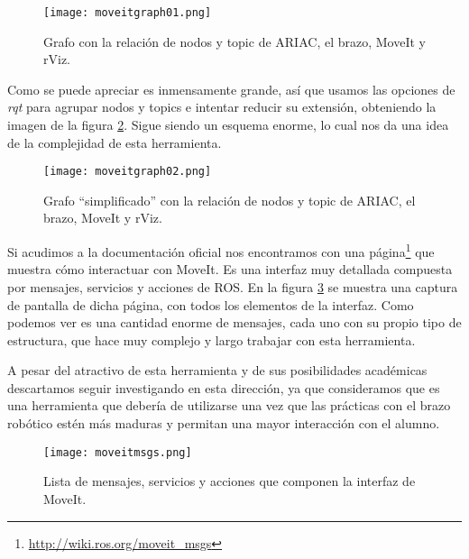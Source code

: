 \begin{figure}[h]
	\centering
	\texttt{[image: moveitgraph01.png]}
	\caption{Grafo con la relación de nodos y topic de ARIAC, el brazo, MoveIt y rViz.} \label{fig:moveitgraph1}
\end{figure}

Como se puede apreciar es inmensamente grande, así que usamos las opciones de \textit{rqt} para agrupar nodos y topics e intentar reducir su extensión, obteniendo la imagen de la figura \ref{fig:moveitgraph2}. Sigue siendo un esquema enorme, lo cual nos da una idea de la complejidad de esta herramienta.

\begin{figure}[h]
	\centering
	\texttt{[image: moveitgraph02.png]}
	\caption{Grafo “simplificado” con la relación de nodos y topic de ARIAC, el brazo, MoveIt y rViz.} \label{fig:moveitgraph2}
\end{figure}

Si acudimos a la documentación oficial nos encontramos con una página\footnote{\url{http://wiki.ros.org/moveit_msgs}} que muestra cómo interactuar con MoveIt. Es una interfaz muy detallada compuesta por mensajes, servicios y acciones de ROS. En la figura \ref{fig:moveitmsgs} se muestra una captura de pantalla de dicha página, con todos los elementos de la interfaz. Como podemos ver es una cantidad enorme de mensajes, cada uno con su propio tipo de estructura, que hace muy complejo y largo trabajar con esta herramienta.

A pesar del atractivo de esta herramienta y de sus posibilidades académicas descartamos seguir investigando en esta dirección, ya que consideramos que es una herramienta que debería de utilizarse una vez que las prácticas con el brazo robótico estén más maduras y permitan una mayor interacción con el alumno.

\begin{figure}[p]
	\centering
	\texttt{[image: moveitmsgs.png]}
	\caption{Lista de mensajes, servicios y acciones que componen la interfaz de MoveIt.} \label{fig:moveitmsgs}
\end{figure}








